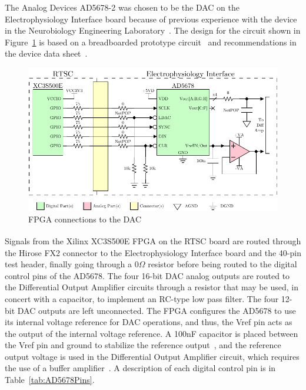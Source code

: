 The Analog Devices AD5678-2 was chosen to be the DAC on the Electrophysiology Interface board because of previous experience with the device in the Neurobiology Engineering Laboratory~\cite{BatzerCorsiCrampton}.  The design for the circuit shown in Figure~\ref{fig:DAC} is based on a breadboarded prototype circuit~\cite{BatzerCorsiCrampton} and recommendations in the device data sheet~\cite{AD5678ds}.

\begin{figure}[H]
	\centering 
		\includegraphics{./figures/StimAmp} 
	\caption{FPGA connections to the DAC\label{fig:DAC}}
\end{figure}

Signals from the Xilinx\textsuperscript{\textregistered} XC3S500E FPGA on the RTSC board are routed through the Hirose FX2 connector to the Electrophysiology Interface board and the 40-pin test header, finally going through a $0\unit{\Omega}$ resistor before being routed to the digital control pins of the AD5678.  The four 16-bit DAC analog outputs are routed to the Differential Output Amplifier circuits through a resistor that may be used, in concert with a capacitor, to implement an RC-type low pass filter.  The four 12-bit DAC outputs are left unconnected.  The FPGA configures the AD5678 to use its internal voltage reference for DAC operations, and thus, the Vref pin acts as the output of the internal voltage reference.  A 100nF capacitor is placed between the Vref pin and ground to stabilize the reference output~\cite{AD5678ds}, and the reference output voltage is used in the Differential Output Amplifier circuit, which requires the use of a buffer amplifier~\cite{AD5678ds}.  A description of each digital control pin is in Table~\ref{tab:AD5678Pins}.

